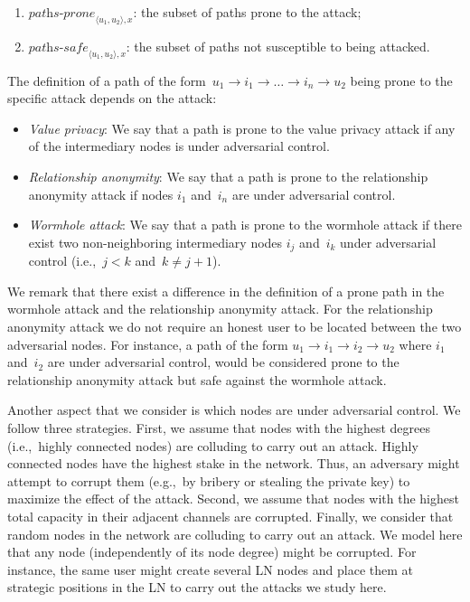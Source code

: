 \begin{enumerate}
	\item $\textit{paths-prone}_{\langle u_1, u_2 \rangle, x}$: the subset of paths prone to the attack;
	\item $\textit{paths-safe}_{\langle u_1, u_2 \rangle, x}$: the subset of paths not susceptible to being attacked.
\end{enumerate}

The definition of a path of the form~$u_1 \rightarrow i_1 \rightarrow \ldots \rightarrow i_n \rightarrow u_2$ being prone to the specific attack depends on the attack:

\begin{itemize}
	\item \textit{Value privacy}: We say that a path is prone to the value privacy attack if any of the intermediary nodes is under adversarial control.
	
	\item \textit{Relationship anonymity}: We say that a path is prone to the relationship anonymity attack if nodes $i_1$ and~$i_n$ are under adversarial control.
	
	\item \textit{Wormhole attack}: We say that a path is prone to the wormhole attack if there exist two non-neighboring intermediary nodes $i_j$ and~$i_k$  under adversarial control (i.e.,~$j < k$ and~$k \neq j + 1$).
\end{itemize}

We remark that there exist a difference in the definition of a prone path in the wormhole attack and the relationship anonymity attack.
For the relationship anonymity attack we do not require an honest user to be located between the two adversarial nodes.
For instance, a path of the form $u_1 \rightarrow i_1 \rightarrow i_2 \rightarrow u_2$ where $i_1$ and~$i_2$ are under adversarial control, would be considered prone to the relationship anonymity attack but safe against the wormhole attack.

Another aspect that we consider is which nodes are under adversarial control.
We follow three strategies.
First, we assume that nodes with the highest degrees (i.e.,~highly connected nodes) are colluding to carry out an attack.
Highly connected nodes have the highest stake in the network.
Thus, an adversary might attempt to corrupt them (e.g.,~by bribery or stealing the private key) to maximize the effect of the attack.
Second, we assume that nodes with the highest total capacity in their adjacent channels are corrupted.
Finally, we consider that random nodes in the network are colluding to carry out an attack.
We model here that any node (independently of its node degree) might be corrupted.
For instance, the same user might create several LN nodes and place them at strategic positions in the LN to carry out the attacks we study here.

